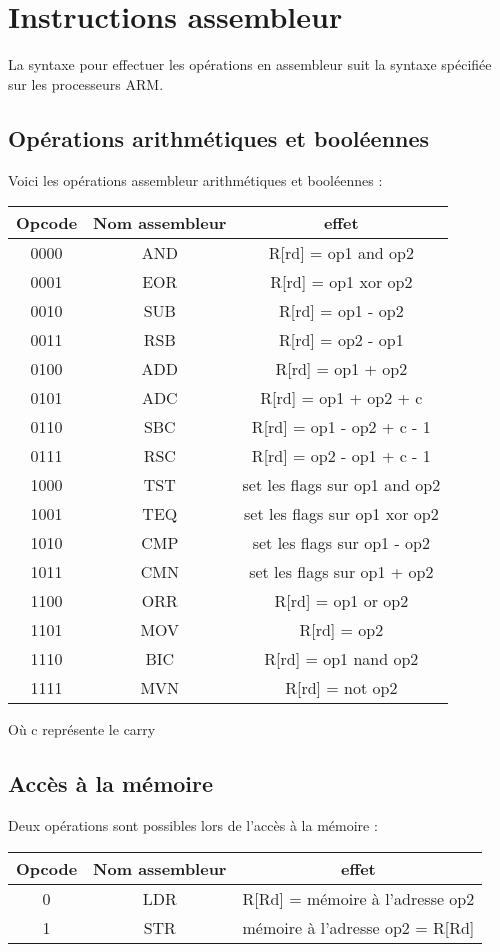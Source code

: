 \documentclass[a4paper]{article}
\begin{document}
\section{Instructions assembleur}

La syntaxe pour effectuer les opérations en assembleur suit la syntaxe spécifiée
sur les processeurs ARM.

\subsection{Opérations arithmétiques et booléennes}

Voici les opérations assembleur arithmétiques et booléennes :\\

\begin{tabular}{|c|c|c|}
  \hline
  Opcode & Nom assembleur & effet \\
  \hline
  0000 & AND & R[rd] = op1 and op2\\
  0001 & EOR & R[rd] = op1 xor op2\\
  0010 & SUB & R[rd] = op1 - op2\\
  0011 & RSB & R[rd] = op2 - op1\\
  0100 & ADD & R[rd] = op1 + op2\\
  0101 & ADC & R[rd] = op1 + op2 + c\\
  0110 & SBC & R[rd] = op1 - op2 + c - 1\\
  0111 & RSC & R[rd] = op2 - op1 + c - 1\\
  1000 & TST & set les flags sur op1 and op2\\
  1001 & TEQ & set les flags sur op1 xor op2\\
  1010 & CMP & set les flags sur op1 - op2\\
  1011 & CMN & set les flags sur op1 + op2\\
  1100 & ORR & R[rd] = op1 or op2\\
  1101 & MOV & R[rd] = op2\\
  1110 & BIC & R[rd] = op1 nand op2\\
  1111 & MVN & R[rd] = not op2\\
  \hline
\end{tabular}

Où c représente le carry

\subsection{Accès à la mémoire}

Deux opérations sont possibles lors de l'accès à la mémoire :\\

\begin{tabular}{|c|c|c|}
  \hline
  Opcode & Nom assembleur & effet\\
  \hline
  0 & LDR & R[Rd] = mémoire à l'adresse op2\\
  1 & STR & mémoire à l'adresse op2 = R[Rd]\\
  \hline

\end{tabular}
\end{document}
